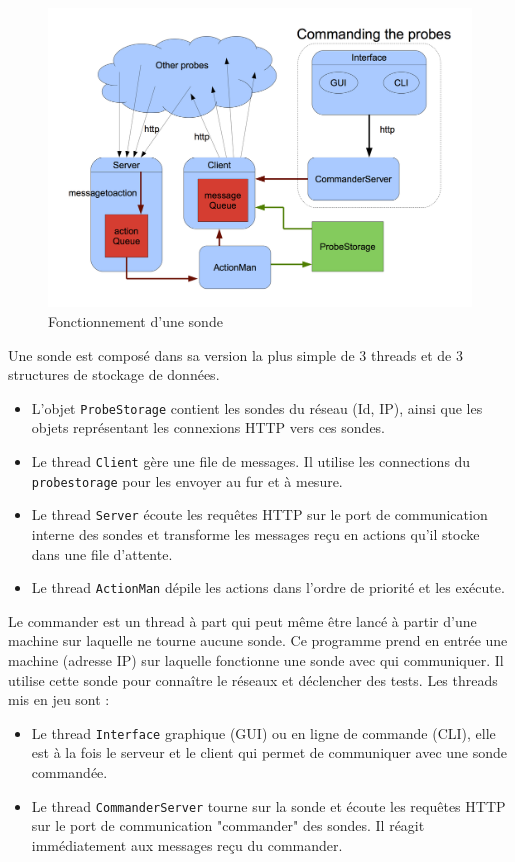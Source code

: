 \documentclass[a4paper,11pt]{article}
\newcommand{\cd}[1]{\texttt{#1}}
\begin{document}
\begin{figure}[!ht]
\centering\includegraphics[width=\linewidth]{img/graphCommander.png}
\caption{Fonctionnement d'une sonde}
\end{figure}

Une sonde est composé dans sa version la plus simple de 3 threads et de 3 structures de stockage de données.
\begin{itemize}
\item L'objet \cd{ProbeStorage} contient les sondes du réseau (Id, IP), ainsi que les objets représentant les connexions HTTP vers ces sondes.
\item Le thread \cd{Client} gère une file de messages. Il utilise les connections du \cd{probestorage} pour les envoyer au fur et à mesure.
\item Le thread \cd{Server} écoute les requêtes HTTP sur le port de communication interne des sondes et transforme les messages reçu en actions qu'il stocke dans une file d'attente.
\item Le thread \cd{ActionMan} dépile les actions dans l'ordre de priorité et les exécute.
\end{itemize}
Le commander est un thread à part qui peut même être lancé à partir d'une machine sur laquelle ne tourne aucune sonde. Ce programme prend en entrée une machine (adresse IP) sur laquelle fonctionne une sonde avec qui communiquer. Il utilise cette sonde pour connaître le réseaux et déclencher des tests.
Les threads mis en jeu sont :
\begin{itemize}
\item Le thread \cd{Interface} graphique (GUI) ou en ligne de commande (CLI), elle est à la fois le serveur et le client qui permet de communiquer avec une sonde commandée.
\item Le thread \cd{CommanderServer} tourne sur la sonde et écoute les requêtes HTTP sur le port de communication "commander" des sondes. Il réagit immédiatement aux messages reçu du commander.
\end{itemize}
\end{document}
